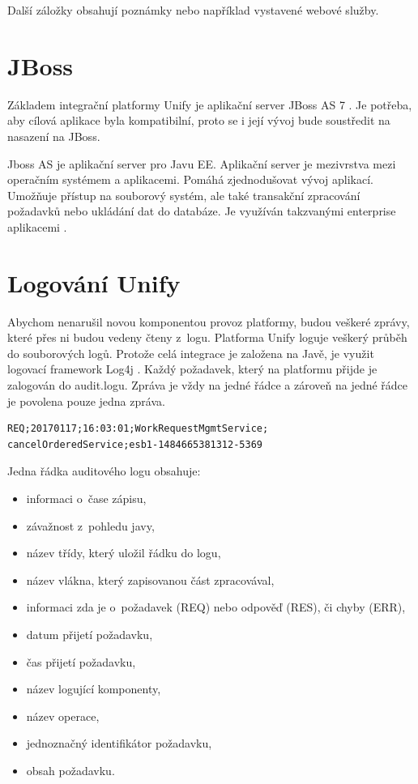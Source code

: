 \documentclass[thesis=M,czech]{FITthesis}[2012/10/20]
\begin{document}
			Další záložky obsahují poznámky nebo například vystavené webové služby.
			
			
		
	\section{JBoss}
		\label{sec:jboss}
		Základem integrační platformy Unify je aplikační server JBoss AS 7 \cite{unify}. Je potřeba, aby cílová aplikace byla kompatibilní, proto se i její vývoj bude soustředit na nasazení na JBoss.
		
		Jboss AS je aplikační server pro Javu EE\cite{jboss}. Aplikační server je mezivrstva mezi operačním systémem a aplikacemi. Pomáhá zjednodušovat vývoj aplikací. Umožňuje přístup na souborový systém, ale také transakční zpracování požadavků nebo ukládání dat do databáze. Je využíván takzvanými enterprise aplikacemi \cite{app_server}. 

					
	\section{Logování Unify}
		\label{sec:logging_unify}
		Abychom nenarušil novou komponentou provoz platformy, budou veškeré zprávy, které přes ni budou vedeny čteny z~logu. Platforma Unify loguje veškerý průběh do souborových logů. Protože celá integrace je založena na Javě, je využit logovací framework Log4j \cite{log4j}.
		Každý požadavek, který na platformu přijde je zalogován do audit.logu. Zpráva je vždy na jedné řádce a zároveň na jedné řádce je povolena pouze jedna zpráva.
		
		\begin{minipage}{\linewidth}
			\begin{lstlisting}[caption={Část řádky v~auditovém logu Unify}, label={lst:log}]
REQ;20170117;16:03:01;WorkRequestMgmtService;
cancelOrderedService;esb1-1484665381312-5369
			\end{lstlisting}
		\end{minipage}
		
		Jedna řádka auditového logu obsahuje:
		
		\begin{itemize} 
			\item informaci o~čase zápisu,
			\item závažnost z~pohledu javy, 
			\item název třídy, který uložil řádku do logu,
			\item název vlákna, který zapisovanou část zpracovával,
			\item informaci zda je o~požadavek (REQ) nebo odpověď (RES), či chyby (ERR),
			\item datum přijetí požadavku,
			\item čas přijetí požadavku,
			\item název logující komponenty,
			\item název operace,
			\item jednoznačný identifikátor požadavku,
			\item obsah požadavku.		
		\end{itemize}
		
\end{document}
